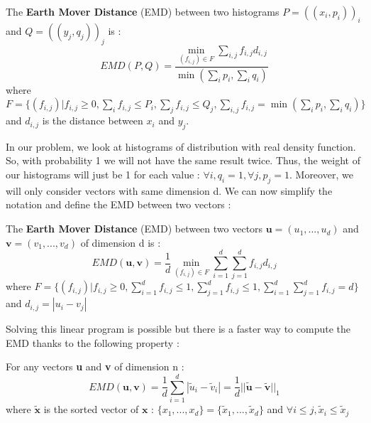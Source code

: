 \documentclass{article}
\begin{document}
	 \begin{definition}
	 The \textbf{Earth Mover Distance} (EMD) between two histograms $P=((x_i,p_i))_i$ and $Q=((y_j,q_j))_j$ is :
	 \begin{equation*}	 
	 EMD(P,Q) = \frac{\min\limits_{(f_{i,j}) \in F} \sum_{i,j} f_{i,j} d_{i,j}}{ \min(\sum_i p_i, \sum_i q_i)}
	 \end{equation*}
	 \newline
	 where \begin{math}F=\{(f_{i,j})| f_{i,j}\geq 0,\sum\limits_{i} f_{i,j} \leq P_i, \sum\limits_{j} f_{i,j} \leq Q_j, \sum\limits_{i,j} f_{i,j} = \min(\sum\limits_i p_i, \sum\limits_i q_i)\} \end{math}\newline
	 and $d_{i,j}$ is the distance between $x_i$ and $y_j$.
	\end{definition}
	
	In our problem, we look at histograms of distribution with real density function. So, with probability 1 we will not have the same result twice. Thus, the weight of our histograms will just be 1 for each value : $\forall i, q_i =1, \forall j, p_j=1$.\newline
	Moreover, we will only consider vectors with same dimension d. We can now simplify the notation and define the EMD between two vectors :
	
	
	\begin{definition}
	 The \textbf{Earth Mover Distance} (EMD) between two vectors $\textbf{u}=(u_1,...,u_d)$ and $\textbf{v}=(v_1,...,v_d)$ of dimension d is :
	 \begin{equation*}
	 EMD(\textbf{u},\textbf{v}) = \frac{1}{d}\min\limits_{(f_{i,j}) \in F} \sum_{i=1}^d \sum_{j=1}^d f_{i,j} d_{i,j}
	 \end{equation*}
	 \newline
	 where \begin{math}F=\{(f_{i,j})| f_{i,j}\geq 0,\sum\limits_{i=1}^d f_{i,j} \leq 1, \sum\limits_{j=1}^d f_{i,j} \leq 1, \sum\limits_{i=1}^d \sum\limits_{j=1}^d f_{i,j} = d\}\end{math}
	 \newline
	 and $d_{i,j}=|u_i-v_j|$
	\end{definition}
	
	Solving this linear program is possible but there is a faster way to compute the EMD thanks to the following property : 
	

	\begin{property}
	For any vectors \textbf{u} and \textbf{v} of dimension n :
	\begin{equation*}	
	EMD(\textbf{u},\textbf{v}) = \frac{1}{d} \sum_{i=1}^d |\tilde{u}_i - \tilde{v}_i| =  \frac{1}{d}||\tilde{\textbf{u}}-\tilde{\textbf{v}}||_1
	\end{equation*}
	where $\tilde{\textbf{x}}$ is the sorted vector of $\textbf{x}$ :
	\newline
	$\{x_1,...,x_d\}=\{\tilde{x}_1,...,\tilde{x}_d\}$ and $\forall i \leq j, \tilde{x}_i \leq \tilde{x}_j$\newline
	\end{property}
\end{document}
